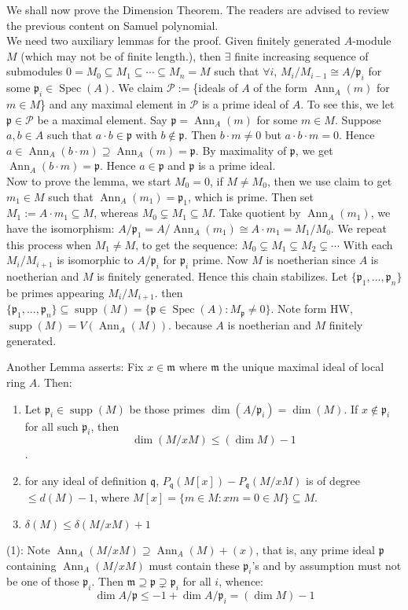 \documentclass[12pt]{article}
\theoremstyle{definition}
\theoremstyle{plain}
\DeclareMathOperator{\Spec}{Spec}
\DeclareMathOperator{\Ann}{Ann}
\DeclareMathOperator{\supp}{supp}
\begin{document}
We shall now prove the Dimension Theorem. The readers are advised to review the previous content on Samuel polynomial.\\
We need two auxiliary lemmas for the proof.
\Lemma Given finitely generated $A$-module $M$ (which may not be of finite length.), then $\exists$ finite increasing sequence of submodules $0=M_0\subseteq M_1\subseteq \cdots \subseteq M_n=M$ such that $\forall i$, $M_i/M_{i-1}\cong A/\mathfrak{p}_i$ for some $\mathfrak{p}_i\in \Spec(A)$.
\proof We claim $\mathcal{P}:=$\{ideals of $A$ of the form $\Ann_A(m)$ for $m\in M$\} and any maximal element in $\mathcal{P}$ is a prime ideal of $A$. To see this, we let $\mathfrak{p}\in \mathcal{P}$ be a maximal element. Say $\mathfrak{p}=\Ann_A(m)$ for some $m\in M$. Suppose $a, b\in A$ such that $a\cdot b\in \mathfrak{p}$ with $b\notin \mathfrak{p}$. Then $b\cdot m\neq 0$ but $a\cdot b\cdot m=0$. Hence $a\in \Ann_A(b\cdot m)\supseteq \Ann_A(m)=\mathfrak{p}$. By maximality of $\mathfrak{p}$, we get $\Ann_A(b \cdot m)=\mathfrak{p}$. Hence $a\in \mathfrak{p}$ and $\mathfrak{p}$ is a prime ideal.\\
\indent Now to prove the lemma, we start $M_0=0$, if $M\neq M_0$, then we use claim to get $m_1\in M$ such that $\Ann_A(m_1)=\mathfrak{p}_1$, which is prime. Then set $M_1:=A\cdot m_1\subseteq M$, whereas $M_0\subsetneq M_1\subseteq M$. Take quotient by $\Ann_A(m_1)$, we have the isomorphism: $A/\mathfrak{p}_1=A/\Ann_A(m_1)\cong A\cdot m_1=M_1/M_0$. We repeat this process when $M_1\neq M$, to get the sequence: $M_0\subsetneq M_1\subsetneq M_2\subsetneq \cdots$ With each $M_i/M_{i+1}$ is isomorphic to $A/\mathfrak{p}_i$ for $\mathfrak{p}_i$ prime. Now $M$ is noetherian since $A$ is noetherian and $M$ is finitely generated. Hence this chain stabilizes.
\Cor Let $\{\mathfrak{p}_1, ..., \mathfrak{p}_n\}$ be primes appearing $M_i/M_{i+1}$. then $\{\mathfrak{p}_1, ..., \mathfrak{p}_n\}\subseteq \supp(M)=\{\mathfrak{p}\in \Spec(A): M_\mathfrak{p}\neq 0\}$.
\Cor  Note form HW, $\supp(M)=V(\Ann_A(M))$. because $A$ is noetherian and $M$ finitely generated.

\medskip
Another Lemma asserts:
\Lemma Fix $x\in \mathfrak{m}$ where $\mathfrak{m}$ the unique maximal ideal of local ring $A$. Then:\leavevmode
\begin{enumerate}
  \item Let $\mathfrak{p}_i\in \supp(M)$ be those primes $\dim(A/\mathfrak{p}_i)=\dim(M)$. If $x\notin \mathfrak{p}_i$ for all such $\mathfrak{p}_i$, then
  \[\dim(M/xM)\leq (\dim M)-1\].
  \item for any ideal of definition $\mathfrak{q}$, $P_\mathfrak{q}(M[x])-P_\mathfrak{q}(M/xM)$ is of degree$\leq d(M)-1$, where $M[x]=\{m\in M: xm=0\in M\}\subseteq M$.
  \item $\delta(M)\leq \delta(M/xM)+1$
\end{enumerate}
\proof (1): Note $\Ann_A(M/xM)\supseteq \Ann_A(M)+(x)$, that is, any prime ideal $\mathfrak{p}$ containing $\Ann_A(M/xM)$ must contain these $\mathfrak{p}_i$'s and by assumption must not be one of those $\mathfrak{p}_i$. Then $\mathfrak{m}\supseteq \mathfrak{p}\supsetneq \mathfrak{p}_i$ for all $i$, whence:
\[\dim A/\mathfrak{p}\leq -1+\dim A/\mathfrak{p}_i=(\dim M)-1\]
\end{document}
